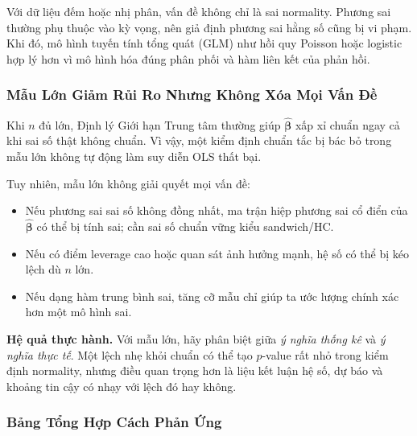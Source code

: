Với dữ liệu đếm hoặc nhị phân, vấn đề không chỉ là sai normality. Phương sai thường phụ thuộc vào kỳ vọng, nên giả định phương sai hằng số cũng bị vi phạm. Khi đó, mô hình tuyến tính tổng quát (GLM) như hồi quy Poisson hoặc logistic hợp lý hơn vì mô hình hóa đúng phân phối và hàm liên kết của phản hồi.

\subsubsection{Mẫu Lớn Giảm Rủi Ro Nhưng Không Xóa Mọi Vấn Đề}

Khi $n$ đủ lớn, Định lý Giới hạn Trung tâm thường giúp $\hat{\boldsymbol{\beta}}$ xấp xỉ chuẩn ngay cả khi sai số thật không chuẩn. Vì vậy, một kiểm định chuẩn tắc bị bác bỏ trong mẫu lớn không tự động làm suy diễn OLS thất bại.

Tuy nhiên, mẫu lớn không giải quyết mọi vấn đề:
\begin{itemize}
  \item Nếu phương sai sai số không đồng nhất, ma trận hiệp phương sai cổ điển của $\hat{\boldsymbol{\beta}}$ có thể bị tính sai; cần sai số chuẩn vững kiểu sandwich/HC.
  \item Nếu có điểm leverage cao hoặc quan sát ảnh hưởng mạnh, hệ số có thể bị kéo lệch dù $n$ lớn.
  \item Nếu dạng hàm trung bình sai, tăng cỡ mẫu chỉ giúp ta ước lượng chính xác hơn một mô hình sai.
\end{itemize}

\textbf{Hệ quả thực hành.} Với mẫu lớn, hãy phân biệt giữa \textit{ý nghĩa thống kê} và \textit{ý nghĩa thực tế}. Một lệch nhẹ khỏi chuẩn có thể tạo $p$-value rất nhỏ trong kiểm định normality, nhưng điều quan trọng hơn là liệu kết luận hệ số, dự báo và khoảng tin cậy có nhạy với lệch đó hay không.

\subsubsection{Bảng Tổng Hợp Cách Phản Ứng}

